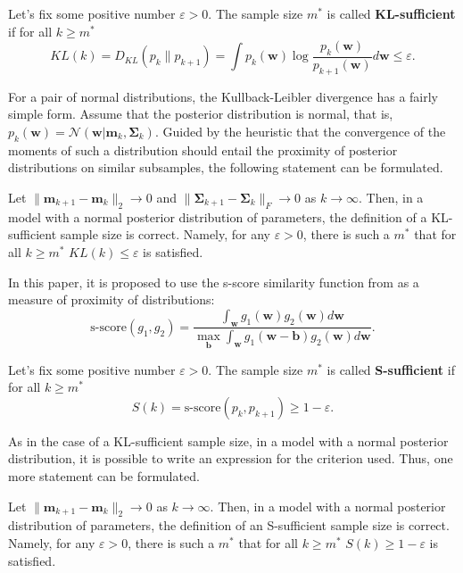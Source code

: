\documentclass[
11pt,%
tightenlines,%
twoside,%
onecolumn,%
nofloats,%
nobibnotes,%
nofootinbib,%
superscriptaddress,%
noshowpacs,%
centertags]%
{revtex4-2}
\begin{document}
\begin{definition}
    Let's fix some positive number $\varepsilon > 0$. The sample size $m^*$ is called \textbf{KL-sufficient} if for all $k\geqslant m^*$
    \[ KL(k) = D_{KL}(p_k \| p_{k+1}) = \int p_k(\mathbf{w}) \log{\dfrac{p_k(\mathbf{w})}{p_{k+1}(\mathbf{w})}} d\mathbf{w} \leqslant \varepsilon. \]
\end{definition}

For a pair of normal distributions, the Kullback-Leibler divergence has a fairly simple form. Assume that the posterior distribution is normal, that is, $p_k(\mathbf{w}) = \mathcal{N}\left(\mathbf{w}|\mathbf{m}_k, \mathbf{\Sigma}_k\right)$. Guided by the heuristic that the convergence of the moments of such a distribution should entail the proximity of posterior distributions on similar subsamples, the following statement can be formulated.

\begin{theorem}[Kiselev, 2024]\label{theorem2}
    Let $\|\mathbf{m}_{k+1} - \mathbf{m}_k\|_2 \to 0$ and $\|\mathbf{\Sigma}_{k+1} - \mathbf{\Sigma}_k\|_{F}\to 0$ as $k\to \infty$. Then, in a model with a normal posterior distribution of parameters, the definition of a KL-sufficient sample size is correct. Namely, for any $\varepsilon > 0$, there is such a $m^*$ that for all $k\geqslant m^*$ $KL(k)\leqslant\varepsilon$ is satisfied.
\end{theorem}

In this paper, it is proposed to use the s-score similarity function from \citep{Aduenko2017} as a measure of proximity of distributions:
\[\text{s-score}(g_1, g_2) = \dfrac{\int_{\mathbf{w}} g_1(\mathbf{w}) g_2(\mathbf{w}) d\mathbf{w}}{\max_{\mathbf{b}} \int_{\mathbf{w}} g_1(\mathbf{w} - \mathbf{b}) g_2(\mathbf{w}) d\mathbf{w}}. \]

\begin{definition}
    Let's fix some positive number $\varepsilon > 0$. The sample size $m^*$ is called \textbf{S-sufficient} if for all $k\geqslant m^*$
    \[ S(k) = \text{s-score}(p_k, p_{k+1}) \geqslant 1-\varepsilon. \]
\end{definition}

As in the case of a KL-sufficient sample size, in a model with a normal posterior distribution, it is possible to write an expression for the criterion used. Thus, one more statement can be formulated.

\begin{theorem}[Kiselev, 2024]\label{theorem3}
    Let $\|\mathbf{m}_{k+1} - \mathbf{m}_k\|_2\to 0$ as $k \to \infty$. Then, in a model with a normal posterior distribution of parameters, the definition of an S-sufficient sample size is correct. Namely, for any $\varepsilon > 0$, there is such a $m^*$ that for all $k\geqslant m^*$ $S(k)\geqslant 1-\varepsilon$ is satisfied.
\end{theorem}
\end{document}
